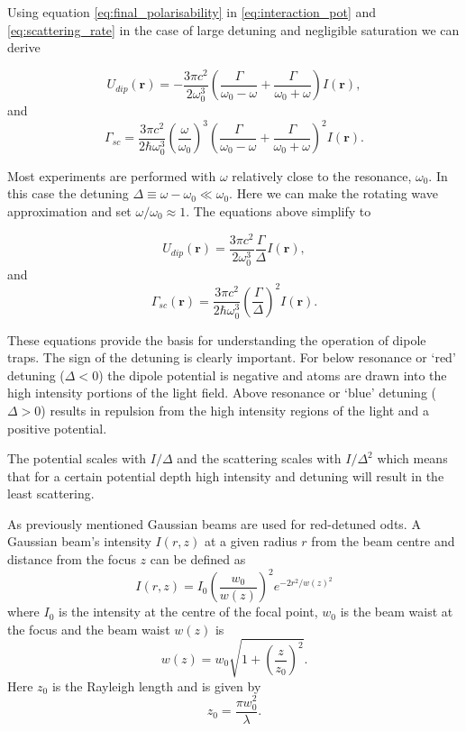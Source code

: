Using equation \ref{eq:final_polarisability} in \ref{eq:interaction_pot} and \ref{eq:scattering_rate} in the case of large detuning and negligible saturation we can derive

\begin{equation}\label{eq:potential}
U_{dip}(\boldsymbol r) = -\frac{3\pi c^2}{2\omega_0^3}\left(\frac{\Gamma}{\omega_0-\omega} + \frac{\Gamma}{\omega_0+\omega}\right) I(\boldsymbol r),
\end{equation}
and
\begin{equation}\label{eq:scattering}
\Gamma_{sc} = \frac{3\pi c^2}{2\hbar\omega_0^3} \left(\frac{\omega}{\omega_0}\right)^3 \left(\frac{\Gamma}{\omega_0 - \omega} + \frac{\Gamma}{\omega_0+\omega}\right)^2 I(\boldsymbol r).
\end{equation}

Most experiments are performed with $\omega$ relatively close to the resonance, $\omega_0$. In this case the detuning $\Delta\equiv \omega - \omega_0 \ll \omega_0$. Here we can make the rotating wave approximation and set $\omega/\omega_0\approx 1$. The equations above simplify to

\begin{equation}\label{eq:simple_potential}
U_{dip}(\boldsymbol{r}) = \frac{3\pi c^2}{2 \omega_0^3} \frac{\Gamma}{\Delta} I(\boldsymbol{r}),
\end{equation}
and
\begin{equation}\label{eq:simple_scattering}
\Gamma_{sc} (\boldsymbol r ) = \frac{3\pi c^2}{2\hbar\omega_0^3} \left( \frac{\Gamma}{\Delta} \right)^2 I(\boldsymbol r ).
\end{equation}

These equations provide the basis for understanding the operation of dipole traps. The sign of the detuning is clearly important. For below resonance or `red' detuning ($\Delta < 0$) the dipole potential is negative and atoms are drawn into the high intensity portions of the light field. Above resonance or `blue' detuning ($\Delta > 0$) results in repulsion from the high intensity regions of the light and a positive potential.

The potential scales with $I/\Delta$ and the scattering scales with $I/\Delta^2$ which means that for a certain potential depth high intensity and detuning will result in the least scattering.

As previously mentioned Gaussian beams are used for red-detuned \glspl{odt}. A Gaussian beam's intensity $I(r, z)$ at a given radius $r$ from the beam centre and distance from the focus $z$ can be defined as\cite{saleh_fundamentals_2007}
\begin{equation}
I(r, z) = I_0 \left( \frac{w_0}{w(z)}\right)^2 e^{-2r^2/w(z)^2}
\end{equation}
where $I_0$ is the intensity at the centre of the focal point, $w_0$ is the beam waist at the focus and the beam waist $w(z)$ is
\begin{equation}
w(z) = w_0\sqrt{1 + \left(\frac{z}{z_0} \right)^2}.
\end{equation}
Here $z_0$ is the Rayleigh length and is given by
\begin{equation}
z_0 = \frac{\pi w_0^2}{\lambda}.
\end{equation}

